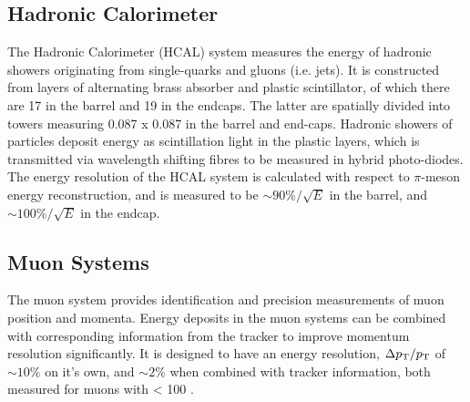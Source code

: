 \subsection{Hadronic Calorimeter}


The Hadronic Calorimeter (HCAL) system measures the energy of hadronic showers 
originating from single-quarks and gluons (i.e. jets). It is constructed from
layers of alternating brass absorber and plastic scintillator, of which there
are 17 in the barrel and 19 in the endcaps. The latter are spatially
divided into towers measuring 0.087 x 0.087 in the barrel and end-caps. Hadronic
showers of particles deposit energy as scintillation light in the plastic layers,
which is transmitted via wavelength shifting fibres to be measured in hybrid
photo-diodes. The energy resolution of the HCAL system is calculated with
respect to $\pi$-meson energy reconstruction, and is measured to be
$\sim 90\%/\sqrt{E}$ in the barrel, and $\sim 100\%/\sqrt{E}$ in the endcap.


\subsection{Muon Systems}


The muon system provides identification and precision measurements of
muon position and momenta. Energy deposits in the muon systems can be combined
with corresponding information from the tracker to improve momentum resolution
significantly. It is designed to have an energy resolution, $\Delta {p_{\text T}}/{p_{\text T}}$ of
$\sim10\%$ on it's own, and $\sim2\%$ when combined with tracker information,
both measured for muons with \Pt < 100 \gev.

